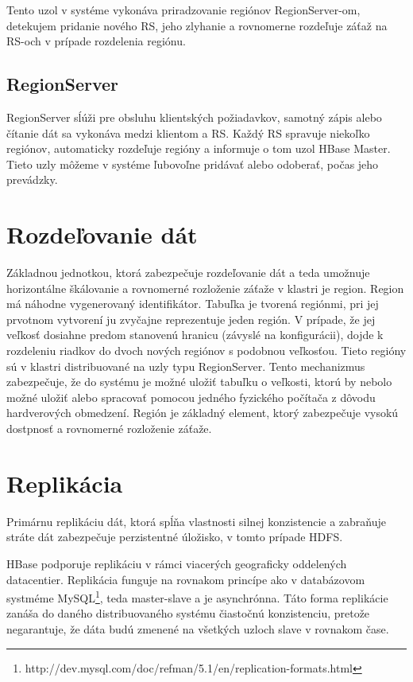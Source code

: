 \documentclass[11pt,twoside,a4paper]{book}
\begin{document}
Tento uzol v systéme vykonáva priradzovanie regiónov RegionServer-om, detekujem pridanie nového RS, jeho zlyhanie a rovnomerne rozdeľuje záťaž na RS-och v prípade rozdelenia regiónu.

\subsection*{RegionServer}

RegionServer sĺúži pre obsluhu klientských požiadavkov, samotný zápis alebo čítanie dát sa vykonáva medzi klientom a RS. Každý RS spravuje niekoľko regiónov, automaticky rozdeľuje regióny a informuje o tom uzol HBase Master. Tieto uzly môžeme v systéme ľubovoľne pridávať alebo odoberať, počas jeho prevádzky.


\section{Rozdeľovanie dát}

Základnou jednotkou, ktorá zabezpečuje rozdeľovanie dát a teda umožnuje horizontálne škálovanie a rovnomerné rozloženie záťaže v klastri je region. Region má náhodne vygenerovaný identifikátor. Tabuľka je tvorená regiónmi, pri jej prvotnom vytvorení ju zvyčajne reprezentuje jeden región. V prípade, že jej veľkosť dosiahne predom stanovenú hranicu (závyslé na konfigurácii), dojde k rozdeleniu riadkov do dvoch nových regiónov s podobnou veľkosťou. Tieto regióny sú  v klastri distribuované na uzly typu RegionServer. Tento mechanizmus zabezpečuje, že do systému je možné uložiť tabuľku o veľkosti, ktorú by nebolo možné uložiť alebo spracovať pomocou jedného fyzického počítača z dôvodu hardverových obmedzení. Región je základný element, ktorý zabezpečuje vysokú dostpnosť a rovnomerné rozloženie záťaže.

\section{Replikácia}
Primárnu replikáciu dát, ktorá spĺňa vlastnosti silnej konzistencie a zabraňuje stráte dát zabezpečuje perzistentné úložisko, v tomto prípade HDFS.

HBase podporuje replikáciu v rámci viacerých geograficky oddelených datacentier. Replikácia funguje na rovnakom princípe ako v databázovom systméme MySQL\footnote{http://dev.mysql.com/doc/refman/5.1/en/replication-formats.html}, teda master-slave a je asynchrónna. Táto forma replikácie zanáša do daného distribuovaného systému čiastočnú konzistenciu, pretože negarantuje, že dáta budú zmenené na všetkých uzloch slave v rovnakom čase.
\end{document}
